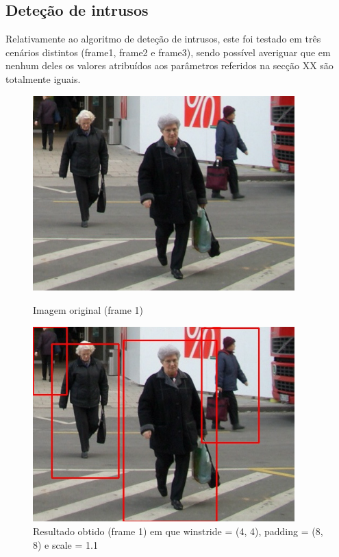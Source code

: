 \subsection{Deteção de intrusos}

Relativamente ao algoritmo de deteção de intrusos, este foi testado em três cenários distintos (frame1, frame2 e frame3), sendo possível averiguar que em nenhum deles os valores atribuídos aos parâmetros referidos na secção XX são totalmente iguais.




\begin{figure}[h]
	\centering
	\begin{minipage}[b]{0.49\textwidth}
		\centering
		\includegraphics[width=0.9\textwidth]{img/vision/exemplos/frame1.jpg}
		\caption[Imagem original (frame 1)]{Imagem original (frame 1) \newline \newline}
		\label{bluetth05-res}
	\end{minipage}
	\hfill
	\begin{minipage}[b]{0.49\textwidth}
		\centering
		\includegraphics[width=0.9\textwidth]{img/vision/exemplos/result_frame1.jpg}
		\caption[Resultado obtido (frame 1)]{Resultado obtido (frame 1) em que  winstride = (4, 4), padding = (8, 8) e scale = 1.1}
		\label{comimageesquema}
	\end{minipage}
\end{figure}




